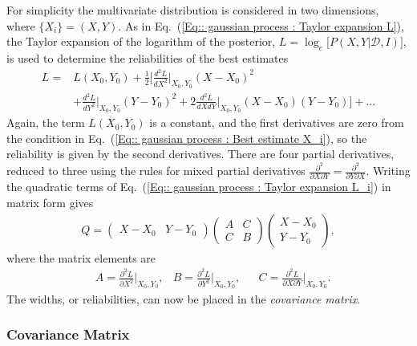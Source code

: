\documentclass[twoside,english]{uiofysmaster}
\begin{document}
{{For simplicity the multivariate distribution is considered in two dimensions, where $\{ X_i \}=(X, Y)$. As in Eq.~(\ref{Eq:: gaussian process : Taylor expansion L}), the Taylor expansion of the logarithm of the posterior, $L = \log_e \Big[ P(X, Y |\mathcal{D}, I) \Big]$, is used to determine the reliabilities of the best estimates
\begin{align}\label{Eq:: gaussian process : Taylor expansion L_i}
L =& L(X_0, Y_0) + \frac{1}{2} \Big[ \frac{d^2L}{dX^2}  \Big|_{X_0, Y_0}(X-X_0)^2 \nonumber \\
& + \frac{d^2L}{dY^2}  \Big|_{X_0, Y_0}(Y-Y_0)^2 + 2 \frac{d^2L}{dXdY}  \Big|_{X_0, Y_0}(X-X_0)(Y-Y_0) \Big] +...
\end{align}
Again, the term $L(X_0, Y_0)$ is a constant, and the first derivatives are zero from the condition in Eq.~(\ref{Eq:: gaussian process : Best estimate X_i}), so the reliability is given by the second derivatives. There are four partial derivatives, reduced to three using the rules for mixed partial derivatives $\frac{\partial^2}{\partial X \partial Y} = \frac{\partial^2}{\partial Y \partial X}$. Writing the quadratic terms of Eq.~(\ref{Eq:: gaussian process : Taylor expansion L_i}) in matrix form gives
\begin{align}
Q = 
\begin{pmatrix}
X-X_0 & Y -Y_0
\end{pmatrix}
\begin{pmatrix}
A & C\\
C & B
\end{pmatrix}
\begin{pmatrix}
X -X_0\\
Y-Y_0
\end{pmatrix},
\end{align}
where the matrix elements are 
\begin{align}\label{Eq:: gaussian process : covariance matrix ABC}
&A = \frac{\partial^2 L}{\partial X^2} \Big|_{X_0, Y_0}, &B = \frac{\partial^2 L}{\partial Y^2} \Big|_{X_0, Y_0}, &&C = \frac{\partial^2 L}{\partial X \partial Y} \Big|_{X_0, Y_0}.
\end{align}
The widths, or reliabilities, can now be placed in the \textit{covariance matrix}.


\subsubsection{Covariance Matrix}

}}
\end{document}
